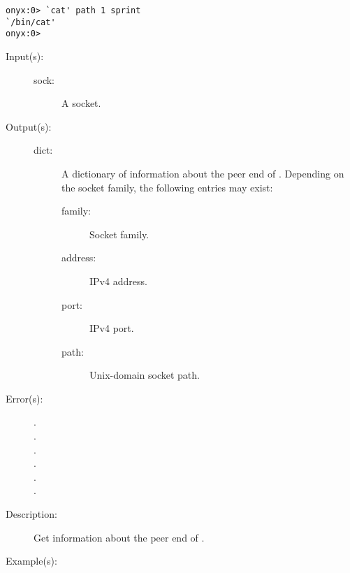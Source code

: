 \begin{description}
\begin{description}
\begin{verbatim}
onyx:0> `cat' path 1 sprint
`/bin/cat'
onyx:0>
		\end{verbatim}
	\end{description}
\label{systemdict:peername}
\item[{\onyxop{sock}{peername}{dict}}: ]
	\begin{description}\item[]
	\item[Input(s): ]
		\begin{description}\item[]
		\item[sock: ]
			A socket.
		\end{description}
	\item[Output(s): ]
		\begin{description}\item[]
		\item[dict: ]
			A dictionary of information about the peer end of
			.  Depending on the socket family, the
			following entries may exist:
			\begin{description}%
			\item[family: ] Socket family.
			\item[address: ] IPv4 address.
			\item[port: ] IPv4 port.
			\item[path: ] Unix-domain socket path.
			\end{description}
		\end{description}
	\item[Error(s): ]
		\begin{description}\item[]
		\item[.]
		\item[.]
		\item[.]
		\item[.]
		\item[.]
		\item[.]
		\end{description}
	\item[Description: ]
		Get information about the peer end of .
	\item[Example(s): ]\begin{verbatim}


\end{verbatim}
\end{description}
\end{description}
